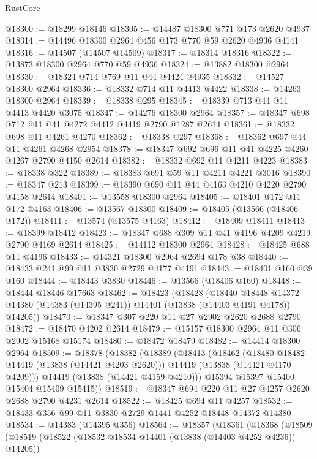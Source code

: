 \begin{lexlean}{RustCore}
\begin{coremodule}
@18300 := @18299 @18146
@18305 := @14487 @18300 @771 @173 @2620 @4937
@18314 := @14496 @18300 @2964 @456 @173 @770 @59 @2620 @4936 @4141
@18316 := @14507 (@14507 @14509)
@18317 := @18314 @18316
@18322 := @13873 @18300 @2964 @770 @59 @4936
@18324 := @13882 @18300 @2964
@18330 := @18324 @714 @769 @11 @44 @4424 @4935
@18332 := @14527 @18300 @2964
@18336 := @18332 @714 @11 @4413 @4422
@18338 := @14263 @18300 @2964
@18339 := @18338 @295
@18345 := @18339 @713 @44 @11 @4413 @4420 @3075
@18347 := @14276 @18300 @2964
@18357 := @18347 @698 @712 @11 @41 @4272 @4412 @4419 @2790 @1287 @2614
@18361 := @18332 @698 @11 @4261 @4270
@18362 := @18338 @297
@18368 := @18362 @697 @44 @11 @4261 @4268 @2954
@18378 := @18347 @692 @696 @11 @41 @4225 @4260 @4267 @2790 @4150 @2614
@18382 := @18332 @692 @11 @4211 @4223
@18383 := @18338 @322
@18389 := @18383 @691 @59 @11 @4211 @4221 @3016
@18390 := @18347 @213
@18399 := @18390 @690 @11 @44 @4163 @4210 @4220 @2790 @4158 @2614
@18401 := @13558 @18300 @2964
@18405 := @18401 @172 @11 @172 @4163
@18406 := @13567 @18300
@18409 := @18405 (@13566 (@18406 @172))
@18411 := @13574 (@13575 @4163)
@18412 := @18409 @18411
@18413 := @18399 @18412
@18423 := @18347 @688 @309 @11 @41 @4196 @4209 @4219 @2790 @4169 @2614
@18425 := @14112 @18300 @2964
@18428 := @18425 @688 @11 @4196
@18433 := @14321 @18300 @2964 @2694 @178 @38
@18440 := @18433 @241 @99 @11 @3830 @2729 @4177 @4191
@18443 := @18401 @160 @39 @160
@18444 := @18443 @3830
@18446 := @13566 (@18406 @160)
@18448 := @18444 @18446 @17663
@18462 := @18423
    (@18428
      (@18440
        @18448
        @14372
        @14380
        (@14383 (@14395 @241))
        @14401
        (@13838 (@14403 @4191 @4178))
        @14205))
@18470 := @18347 @307 @220 @11 @27 @2902 @2620 @2688 @2790
@18472 := @18470 @4202 @2614
@18479 := @15157 @18300 @2964 @11 @306 @2902 @15168 @15174
@18480 := @18472 @18479
@18482 := @14414 @18300 @2964
@18509 := @18378
    (@18382
      (@18389
        (@18413
          (@18462
            (@18480 @18482 @14419 (@13838 (@14421 @4203 @2620)))
            @14419
            (@13838 (@14421 @4170 @4209)))
          @14419
          (@13838 (@14421 @4159 @4210)))
        @15394
        @15397
        @15400
        @15404
        @15409
        @15415))
@18519 := @18347 @694 @220 @11 @27 @4257 @2620 @2688 @2790 @4231 @2614
@18522 := @18425 @694 @11 @4257
@18532 := @18433 @356 @99 @11 @3830 @2729 @1441 @4252 @18448 @14372 @14380
@18534 := @14383 (@14395 @356)
@18564 := @18357
    (@18361
      (@18368
        (@18509
          (@18519
            (@18522 (@18532 @18534 @14401 (@13838 (@14403 @4252 @4236)) @14205))

\end{coremodule}
\end{lexlean}
